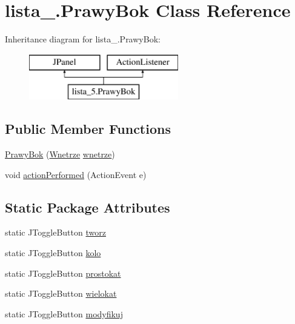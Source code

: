 \hypertarget{classlista__5_1_1_prawy_bok}{}\section{lista\+\_.\+Prawy\+Bok Class Reference}
\label{classlista__5_1_1_prawy_bok}
Inheritance diagram for lista\+\_.\+Prawy\+Bok\+:\begin{figure}[H]
\begin{center}
\leavevmode
\includegraphics[height=2.000000cm]{classlista__5_1_1_prawy_bok}
\end{center}
\end{figure}
\subsection*{Public Member Functions}
\begin{DoxyCompactItemize}
\item 
\mbox{\hyperlink{classlista__5_1_1_prawy_bok_af7872920a7b9440729c7321e98b62de3}{Prawy\+Bok}} (\mbox{\hyperlink{classlista__5_1_1_wnetrze}{Wnetrze}} \mbox{\hyperlink{classlista__5_1_1_prawy_bok_a78d3ca2516dbab20a29c94c57b83c071}{wnetrze}})
\item 
void \mbox{\hyperlink{classlista__5_1_1_prawy_bok_a8966b8a4e49226ba2116a33c07f3060b}{action\+Performed}} (Action\+Event e)
\end{DoxyCompactItemize}
\subsection*{Static Package Attributes}
\begin{DoxyCompactItemize}
\item 
static J\+Toggle\+Button \mbox{\hyperlink{classlista__5_1_1_prawy_bok_a3d4126ae2e2d5d34dcd1d1dcc7300c85}{tworz}}
\item 
static J\+Toggle\+Button \mbox{\hyperlink{classlista__5_1_1_prawy_bok_ad7381fade3bbf8ffd8a5ad75a7b1f536}{kolo}}
\item 
static J\+Toggle\+Button \mbox{\hyperlink{classlista__5_1_1_prawy_bok_a36967d5d6c89e8b3ed3cf959869865a6}{prostokat}}
\item 
static J\+Toggle\+Button \mbox{\hyperlink{classlista__5_1_1_prawy_bok_ad6cb894230f53ab9e8ccdcab78d3b779}{wielokat}}
\item 
static J\+Toggle\+Button \mbox{\hyperlink{classlista__5_1_1_prawy_bok_afa582913eae025c445b56350c50e2bcf}{modyfikuj}}
\end{DoxyCompactItemize}
